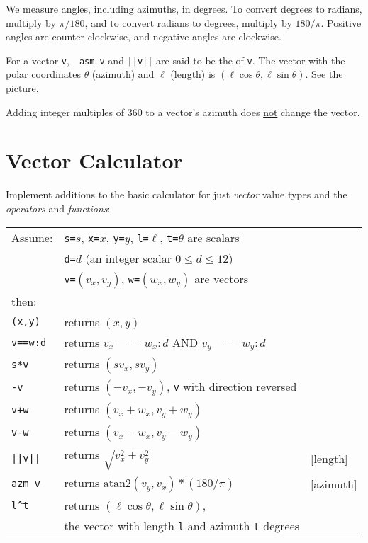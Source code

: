 \documentclass[12pt]{article}
\begin{document}
We measure angles, including azimuths, in degrees.  To convert degrees
to radians, multiply by $\pi/180$, and to convert radians to degrees,
multiply by $180/\pi$.  Positive angles are counter-clockwise, and
negative angles are clockwise.

For a vector {\tt v},~~{\tt asm v} and {\tt ||v||} are said to be
the  of {\tt v}.
The vector with the polar coordinates $\theta$ (azimuth) and $\ell$ (length) is
$(\ell \cos\theta,\ell \sin\theta)$.
See the picture.

Adding integer multiples of 360 to a vector's
azimuth does \underline{not} change the vector.

\newpage

\section{Vector Calculator}
Implement additions to the basic calculator for just {\em vector}
value types and the {\em operators} and {\em functions}:
\begin{center}
\begin{tabular}{l@{~~~~~}l@{~~~~~}l}
Assume: & {\tt s=}$s$, {\tt x=}$x$, {\tt y=$y$},
          {\tt l=$\ell$}, {\tt t=$\theta$}
          are scalars \\
	& {\tt d=}$d$ (an integer scalar $0\le d\le 12$) \\
	& {\tt v=}$(v_x,v_y)$, {\tt w=}$(w_x,w_y)$ are vectors \\
then: \\[1ex]
\tt (x,y) & returns $(x,y)$ \\
\tt v==w:d & returns $v_x==w_x:d$ AND $v_y==w_y:d$ \\
\tt s*v & returns $(s v_x, s v_y )$ \\
\tt -v & returns $( -v_x, -v_y )$, {\tt v} with direction reversed \\
\tt v+w & returns $(v_x + w_x, v_y + w_y)$ \\
\tt v-w & returns $(v_x - w_x, v_y - w_y)$ \\
\tt ||v|| & returns $\sqrt{v_x^2 + v_y^2}$ & [length] \\
\tt azm v & returns $\mathrm{atan2}(v_y,v_x)*(180/\pi)$ & [azimuth] \\
\tt l\textasciicircum t
          & returns $(\ell\cos\theta,\ell\sin\theta)$, \\
	  & the vector with length {\tt l} and azimuth {\tt t} degrees \\
\end{tabular}
\end{center}
\end{document}
